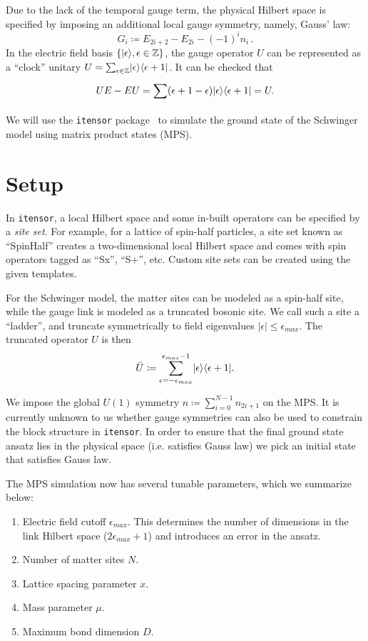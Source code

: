 \documentclass[aps,prl,reprint,superscriptaddress, onecolumn, 11pt]{revtex4-2}
\newcommand{\curly}[1]{\left\{#1\right\}}
\newcommand{\suml}[3]{\sum_{#1}^{#2}#3}
\newcommand{\iten}[0]{\texttt{itensor}}
\DeclarePairedDelimiter\bra{\langle}{\vert}
\DeclarePairedDelimiter\ket{\vert}{\rangle}
\theoremstyle{definition}
\theoremstyle{definition}
\begin{document}
Due to the lack of the temporal gauge term, the physical Hilbert space is specified by imposing an additional local gauge symmetry, namely, Gauss' law:
\begin{equation}
  \label{eq:gaussLaw}
  G_i \coloneqq E_{2i+2} - E_{2i} - (-1)^in_i\, .
\end{equation}
In the electric field basis $\curly{\ket{\epsilon}, \epsilon\in\mathbb{Z}}$, the gauge operator $U$ can be represented as a ``clock'' unitary $U = \suml{\epsilon\in\mathbb{Z}}{}{\ket{\epsilon}\bra{\epsilon+1}}$. It can be checked that
\begin{equation}
  \label{eq:commutationcheck}
  UE - EU = \suml{}{}{(\epsilon+1-\epsilon)\ket{\epsilon}\bra{\epsilon+1}} = U.
\end{equation}
We will use the \iten{} package~\cite{itensor} to simulate the ground state of the Schwinger model using matrix product states (MPS).

\section{Setup}
\label{sec:setup}
In \iten{}, a local Hilbert space and some in-built operators can be specified by a \emph{site set}. For example, for a lattice of spin-half particles, a site set known as ``SpinHalf'' creates a two-dimensional local Hilbert space and comes with spin operators tagged as ``Sx'', ``S+'', etc. Custom site sets can be created using the given templates.

For the Schwinger model, the matter sites can be modeled as a spin-half site, while the gauge link is modeled as a truncated bosonic site. We call such a site a ``ladder'', and truncate symmetrically to field eigenvalues $|\epsilon|\le \epsilon_{max}$. The truncated operator $U$ is then
\begin{equation}
  \label{eq:truncatedU}
  \bar{U} \coloneqq \suml{\epsilon=-\epsilon_{max}}{\epsilon_{max}-1}{\ket{\epsilon}\bra{\epsilon+1}}.
\end{equation}

We impose the global $U(1)$ symmetry $n \coloneqq \suml{i=0}{N-1}{n_{2i+1}}$ on the MPS. It is currently unknown to us whether gauge symmetries can also be used to constrain the block structure in \iten{}. In order to ensure that the final ground state ansatz lies in the physical space (i.e. satisfies Gauss law) we pick an initial state that satisfies Gauss law.

The MPS simulation now has several tunable parameters, which we summarize below:
\begin{enumerate}
\item Electric field cutoff $\epsilon_{max}$. This determines the number of dimensions in the link Hilbert space ($2\epsilon_{max}+1$) and introduces an error in the ansatz.
\item Number of matter sites $N$.
\item Lattice spacing parameter $x$.
\item Mass parameter $\mu$.
\item Maximum bond dimension $D$.
\end{enumerate}
\end{document}

